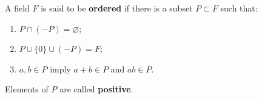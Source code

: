 A field \(F\) is said to be \textbf{ordered} if there is a subset \(P \subset F\) such that:
\begin{enumerate}
\item[(i)] \(P \cap (-P) = \varnothing\);
\item[(ii)] \(P \cup \{0\} \cup (-P) = F\);
\item[(iii)] \(a, b \in P\) imply \(a + b \in P\) and \(ab \in P\).
\end{enumerate}
Elements of \(P\) are called \textbf{positive}.